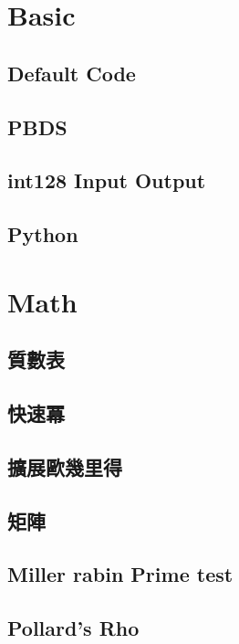 \section{Basic}
\subsection{Default Code}

\subsection{PBDS}

\subsection{int128 Input Output}

\subsection{Python}


\section{Math}
\subsection{質數表} 

\subsection{快速冪} 

\subsection{擴展歐幾里得} 

\subsection{矩陣} 

\subsection{Miller rabin Prime test} 

\subsection{Pollard's Rho} 

